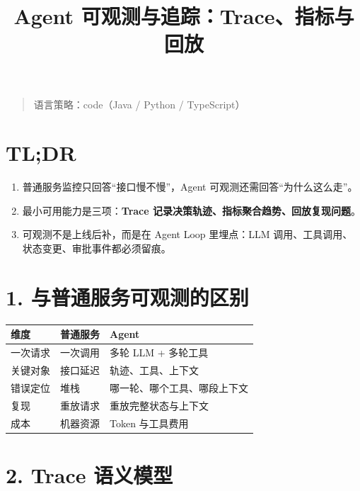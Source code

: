 \documentclass[9pt,a4paper,twocolumn]{ctexart}
\begin{document}
\title{Agent 可观测与追踪：Trace、指标与回放}
\date{}
\maketitle
{}

\begin{quote}
语言策略：code（Java / Python / TypeScript）
\end{quote}



\section*{TL;DR}

\begin{enumerate}[itemsep=1pt, topsep=2pt]
  \item 普通服务监控只回答“接口慢不慢”，Agent 可观测还需回答“为什么这么走”。
  \item 最小可用能力是三项：\textbf{Trace 记录决策轨迹、指标聚合趋势、回放复现问题}。
  \item 可观测不是上线后补，而是在 Agent Loop 里埋点：LLM 调用、工具调用、状态变更、审批事件都必须留痕。
\end{enumerate}


\section*{1. 与普通服务可观测的区别}

{\footnotesize
\begin{tabular}{|p{}|p{}|p{}|}
\hline
\textbf{维度} & \textbf{普通服务} & \textbf{Agent} \\
\hline
一次请求 & 一次调用 & 多轮 LLM + 多轮工具 \\
\hline
关键对象 & 接口延迟 & 轨迹、工具、上下文 \\
\hline
错误定位 & 堆栈 & 哪一轮、哪个工具、哪段上下文 \\
\hline
复现 & 重放请求 & 重放完整状态与上下文 \\
\hline
成本 & 机器资源 & Token 与工具费用 \\
\hline
\end{tabular}
}



\section*{2. Trace 语义模型}
\end{document}
